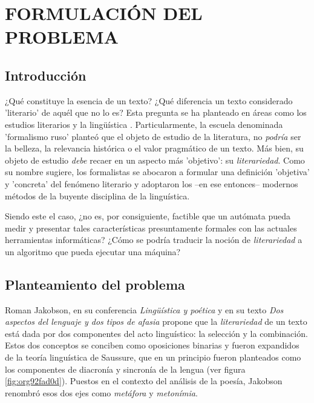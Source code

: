 \documentclass[12pt,letterpaper,twoside]{article}
\begin{document}
\section{FORMULACIÓN DEL PROBLEMA}
\label{sec:org986bad9}
\subsection{Introducción}
\label{sec:org71883d0}

¿Qué constituye la esencia de un texto? ¿Qué diferencia un texto
considerado 'literario' de aquél que no lo es? Esta pregunta se ha
planteado en áreas como los estudios literarios y la lingüística
\cite{eijembaum2010teoria}. Particularmente, la escuela denominada
'formalismo ruso' planteó que el objeto de estudio de la literatura,
no \emph{podría} ser la belleza, la relevancia histórica o el valor
pragmático de un texto. Más bien, su objeto de estudio \emph{debe} recaer
en un aspecto más 'objetivo': su \emph{literariedad}.  Como su nombre
sugiere, los formalistas se abocaron a formular una definición
'objetiva' y 'concreta' del fenómeno literario y adoptaron los --en
ese entonces-- modernos métodos de la buyente disciplina de la
linguística.

Siendo este el caso, ¿no es, por consiguiente, factible que un
autómata pueda medir y presentar tales características presuntamente
formales con las actuales herramientas informáticas? ¿Cómo se podría
traducir la noción de \emph{literariedad} a un algoritmo que pueda ejecutar
una máquina?


\subsection{Planteamiento del problema}
\label{sec:org25951c9}

Roman Jakobson, en su conferencia \emph{Lingüística y poética}
\cite{jakobson1981linguistica} y en su texto \emph{Dos aspectos del lenguaje y dos
tipos de afasia} \cite{jakobson1956two} propone que la
\emph{literariedad} de un texto está dada por dos componentes del acto
linguístico: la selección y la combinación. Estos dos conceptos se
conciben como oposiciones binarias y fueron expandidos de la
teoría linguística de Saussure, que en un principio fueron
planteados como los componentes de diacronía y sincronía de la
lengua (ver figura \ref{fig:org92fad0d}). Puestos en el contexto del
análisis de la poesía, Jakobson renombró esos dos ejes como
\emph{metáfora} y \emph{metonímia}.
\end{document}
